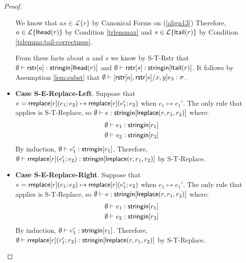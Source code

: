 \documentclass[11pt,leqno]{article}
\theoremstyle{definition}
\newcommand{\Lagr}{\mathcal{L}}
\newcommand{\lang}[1]{\Lagr\{#1\}}
\newcommand{\stringin}[1]{{\sf stringin}[#1]}
\newcommand{\lreplace}[3]{{\sf lreplace}(#1; #2; #3)}
\newcommand{\lhead}[1]{ {\sf lhead}(#1) }
\newcommand{\ltail}[1]{ {\sf ltail}(#1) }
\renewcommand{\lreplace}[3]{{\sf lreplace}(#1, #2, #3)}
\begin{document}
\begin{proof}
\begin{itemize}[label=$ $,itemsep=1ex]
We know that $as \in \lang{r}$ by Canonical Forms on (\ref{align13}) 
Therefore, $a \in \lang{\lhead{r}}$ by Condition \ref{trlemmax} and $s \in \lang{\ltail{r}}$ by Condition \ref{trlemma:tail-correctness}. 

From these facts about $a$ and $s$ we know by S-T-Rstr that $\emptyset\vdash \rstr{a} : \stringin{\lhead{r}}$
and $\emptyset\vdash \rstr{s} : \stringin{\ltail{r}}$.
It follows by Assumption \ref{lem:subst} that  $\emptyset\vdash [{\sf rstr}[a], {\sf rstr}[s] / x,y] e_3 : \sigma$.

\item \textbf{Case S-E-Replace-Left}.
Suppose that $e = {\sf rreplace}[r](e_1;e_2) \mapsto {\sf rreplace}[r](e_1';e_2)$ when $e_1 \mapsto e_1'$.
The only rule that applies is S-T-Replace, so
$\emptyset \vdash e : \stringin{\lreplace{r}{r_1}{r_2}}$ where:
\begin{align*}
\emptyset &\vdash e_1 : \stringin{r_1} \\
\emptyset &\vdash e_2 : \stringin{r_2}
\end{align*}
By induction, $\emptyset \vdash e_1' : \stringin{r_1}$.
Therefore, $\emptyset \vdash \rreplace{r}{e_1'}{e_2} : \stringin{\lreplace{r}{r_1}{r_2}}$ by S-T-Replace.

\item \textbf{Case S-E-Replace-Right}.
Suppose that $e = {\sf rreplace}[r](e_1;e_2) \mapsto {\sf rreplace}[r](e_1';e_2)$ when $e_1 \mapsto e_1'$.
The only rule that applies is S-T-Replace, so
$\emptyset \vdash e : \stringin{\lreplace{r}{r_1}{r_2}}$ where:
\begin{align*}
\emptyset &\vdash e_1 : \stringin{r_1} \\
\emptyset &\vdash e_2 : \stringin{r_2}
\end{align*}
By induction, $\emptyset \vdash e_1' : \stringin{r_1}$.
Therefore, $\emptyset \vdash \rreplace{r}{r_1'}{r_2} : \stringin{\lreplace{r}{r_1}{r_2}}$ by S-T-Replace.


\end{itemize}
\end{proof}
\end{document}
